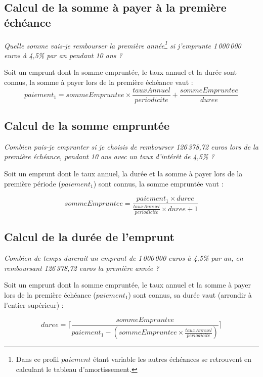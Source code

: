 \documentclass[11pt,a4paper]{scrartcl}
\begin{document}
\subsection{Calcul de la somme à payer à la première échéance}
\emph{Quelle somme vais-je rembourser la première année\footnote{Dans ce profil $paiement$ étant variable les autres échéances se retrouvent en calculant le tableau d'amortissement.} si j'emprunte 1\,000\,000 euros à 4,5\% par an pendant 10 ans ?}


Soit un emprunt dont la somme empruntée, le taux annuel et la durée sont connus, la somme à payer lors de la première échéance vaut :
\begin{equation}
	paiement_1 = sommeEmpruntee \times \frac{tauxAnnuel}{periodicite} + \frac{sommeEmpruntee}{duree}
\end{equation}
		

\subsection{Calcul de la somme empruntée}
\emph{Combien puis-je emprunter si je choisis de rembourser 126\,378,72 euros lors de la première échéance, pendant 10 ans avec un taux d'intérêt de 4,5\% ?}

Soit un emprunt dont le taux annuel, la durée et la somme à payer lors de la première période ($paiement_1$) sont connus, la somme empruntée vaut :

		\begin{equation}
			sommeEmpruntee=\frac{paiement_1 \times duree}{\frac{tauxAnnuel}{periodicite} \times duree + 1}
		\end{equation}

\subsection{Calcul de la durée de l'emprunt}
\emph{Combien de temps durerait un emprunt de 1\,000\,000 euros à 4,5\% par an, en remboursant 126\,378,72 euros la première année ?}

	Soit un emprunt dont la somme empruntée, le taux annuel et la somme à payer lors de la première échéance ($paiement_1$) sont connus, sa durée vaut (arrondir à l'entier supérieur) :


\begin{equation}
	duree=\lceil\frac{sommeEmpruntee}{paiement_1-(sommeEmpruntee \times \frac{tauxAnnuel}{periodicite})}\rceil
\end{equation} 
	
\end{document}
